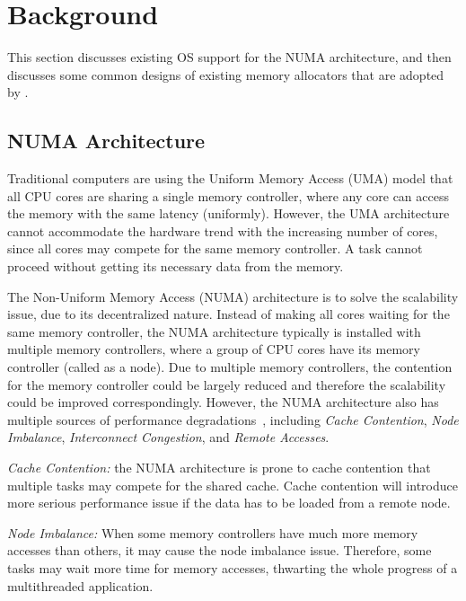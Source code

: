 \section{Background}
\label{sec:background}

This section discusses existing OS support for the NUMA architecture, and then discusses some common designs of existing memory allocators that are adopted by \NM{}.  

\subsection{NUMA Architecture}

\label{sec:numa}

Traditional computers are using the Uniform Memory Access (UMA) model that all CPU cores are sharing a single memory controller, where any core can access the memory with the same latency (uniformly). However, the UMA architecture cannot accommodate the hardware trend with the increasing number of cores, since all cores may compete for the same memory controller. 
A task cannot proceed without getting its necessary data from the memory. 

The Non-Uniform Memory Access (NUMA) architecture is to solve the scalability issue, due to its decentralized nature. Instead of making all cores waiting for the same memory controller, the NUMA architecture typically is installed with multiple memory controllers, where a group of CPU cores have its memory controller (called as a node). Due to multiple memory controllers, the contention for the memory controller could be largely reduced and therefore the scalability could be improved correspondingly. However, the NUMA architecture also has multiple sources of performance degradations~\citep{Blagodurov:2011:CNC:2002181.2002182}, including \textit{Cache Contention}, \textit{Node Imbalance}, \textit{Interconnect Congestion}, and \textit{Remote Accesses}. 

\textit{Cache Contention:} the NUMA architecture is prone to cache contention that multiple tasks may compete for the shared cache. Cache contention will introduce more serious performance issue if the data has to be loaded from a remote node. 
 
\textit{Node Imbalance:} When some memory controllers have much more memory accesses than others, it may cause the node imbalance issue. Therefore, some tasks may wait more time for memory accesses, thwarting the whole progress of a multithreaded application.  

